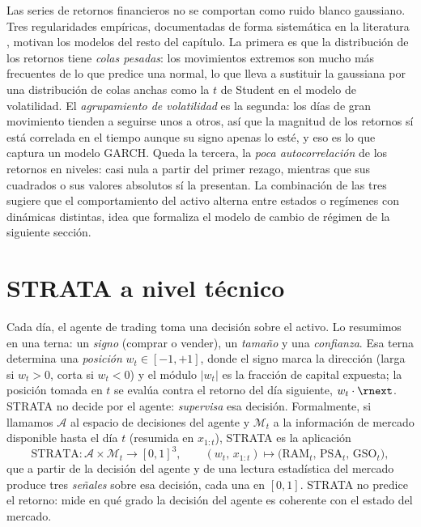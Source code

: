 Las series de retornos financieros no se comportan como ruido blanco gaussiano. Tres regularidades empíricas, documentadas de forma sistemática en la literatura \cite{cont2001}, motivan los modelos del resto del capítulo. La primera es que la distribución de los retornos tiene \emph{colas pesadas}: los movimientos extremos son mucho más frecuentes de lo que predice una normal, lo que lleva a sustituir la gaussiana por una distribución de colas anchas como la $t$ de Student en el modelo de volatilidad. El \emph{agrupamiento de volatilidad} es la segunda: los días de gran movimiento tienden a seguirse unos a otros, así que la magnitud de los retornos sí está correlada en el tiempo aunque su signo apenas lo esté, y eso es lo que captura un modelo GARCH. Queda la tercera, la \emph{poca autocorrelación} de los retornos en niveles: casi nula a partir del primer rezago, mientras que sus cuadrados o sus valores absolutos sí la presentan. La combinación de las tres sugiere que el comportamiento del activo alterna entre estados o regímenes con dinámicas distintas, idea que formaliza el modelo de cambio de régimen de la siguiente sección.

\section{STRATA a nivel técnico}
\label{sec:strata-tecnico}

Cada día, el agente de trading toma una decisión sobre el activo. Lo resumimos en una terna: un \emph{signo} (comprar o vender), un \emph{tamaño} y una \emph{confianza}. Esa terna determina una \emph{posición} $w_t \in [-1, +1]$, donde el signo marca la dirección (larga si $w_t > 0$, corta si $w_t < 0$) y el módulo $|w_t|$ es la fracción de capital expuesta; la posición tomada en $t$ se evalúa contra el retorno del día siguiente, $w_t \cdot \rnext$. STRATA no decide por el agente: \emph{supervisa} esa decisión. Formalmente, si llamamos $\mathcal{A}$ al espacio de decisiones del agente y $\mathcal{M}_t$ a la información de mercado disponible hasta el día $t$ (resumida en $x_{1:t}$), STRATA es la aplicación
\[
\mathrm{STRATA}\colon \mathcal{A} \times \mathcal{M}_t \longrightarrow [0,1]^3,
\qquad
(w_t,\, x_{1:t}) \longmapsto \big(\mathrm{RAM}_t,\, \mathrm{PSA}_t,\, \mathrm{GSO}_t\big),
\]
que a partir de la decisión del agente y de una lectura estadística del mercado produce tres \emph{señales} sobre esa decisión, cada una en $[0,1]$. STRATA no predice el retorno: mide en qué grado la decisión del agente es coherente con el estado del mercado.

